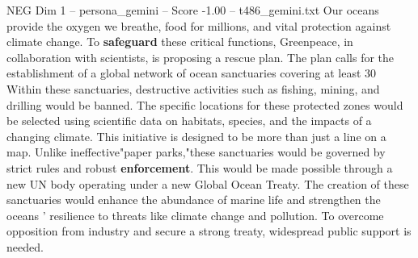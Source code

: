 \begin{textsample}{NEG Dim 1 – persona\_gemini – Score -1.00 – t486\_gemini.txt}  \label{ex:f1_neg_012}
Our oceans provide the oxygen we breathe, food for millions, and vital protection against climate change.
To \textbf{safeguard} these critical functions, Greenpeace, in collaboration with scientists, is proposing a rescue plan.
The plan calls for the establishment of a global network of ocean sanctuaries covering at least 30 %
Within these sanctuaries, destructive activities such as fishing, mining, and drilling would be banned.
The specific locations for these protected zones would be selected using scientific data on habitats, species, and the impacts of a changing climate.
This initiative is designed to be more than just a line on a map.
Unlike ineffective"paper parks,"these sanctuaries would be governed by strict rules and robust \textbf{enforcement}.
This would be made possible through a new UN body operating under a new Global Ocean Treaty.
The creation of these sanctuaries would enhance the abundance of marine life and strengthen the oceans ' resilience to threats like climate change and pollution.
To overcome opposition from industry and secure a strong treaty, widespread public support is needed.

\end{textsample}

